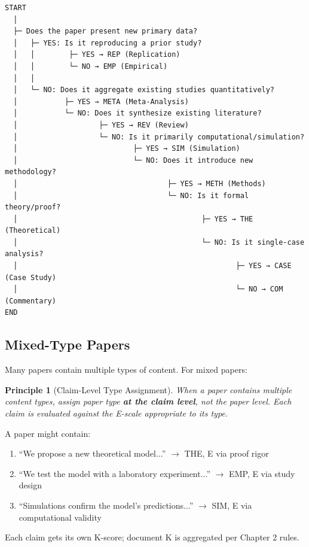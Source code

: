 \documentclass[11pt,a4paper]{article}
\newtheorem{principle}{Principle}[section]
\begin{document}
\begin{verbatim}
START
  │
  ├─ Does the paper present new primary data?
  │   ├─ YES: Is it reproducing a prior study?
  │   │        ├─ YES → REP (Replication)
  │   │        └─ NO → EMP (Empirical)
  │   │
  │   └─ NO: Does it aggregate existing studies quantitatively?
  │           ├─ YES → META (Meta-Analysis)
  │           └─ NO: Does it synthesize existing literature?
  │                   ├─ YES → REV (Review)
  │                   └─ NO: Is it primarily computational/simulation?
  │                           ├─ YES → SIM (Simulation)
  │                           └─ NO: Does it introduce new methodology?
  │                                   ├─ YES → METH (Methods)
  │                                   └─ NO: Is it formal theory/proof?
  │                                           ├─ YES → THE (Theoretical)
  │                                           └─ NO: Is it single-case analysis?
  │                                                   ├─ YES → CASE (Case Study)
  │                                                   └─ NO → COM (Commentary)
END
\end{verbatim}

\subsection{Mixed-Type Papers}

Many papers contain multiple types of content. For mixed papers:

\begin{principle}[Claim-Level Type Assignment]
\label{princ:claim-level}
When a paper contains multiple content types, assign paper type \textbf{at the claim level}, not the paper level. Each claim is evaluated against the E-scale appropriate to its type.
\end{principle}

\begin{examplebox}[title={Mixed-Type Paper Example}]
A paper might contain:
\begin{enumerate}
    \item ``We propose a new theoretical model...'' $\rightarrow$ THE, E via proof rigor
    \item ``We test the model with a laboratory experiment...'' $\rightarrow$ EMP, E via study design
    \item ``Simulations confirm the model's predictions...'' $\rightarrow$ SIM, E via computational validity
\end{enumerate}

Each claim gets its own K-score; document K is aggregated per Chapter 2 rules.
\end{examplebox}
\end{document}
